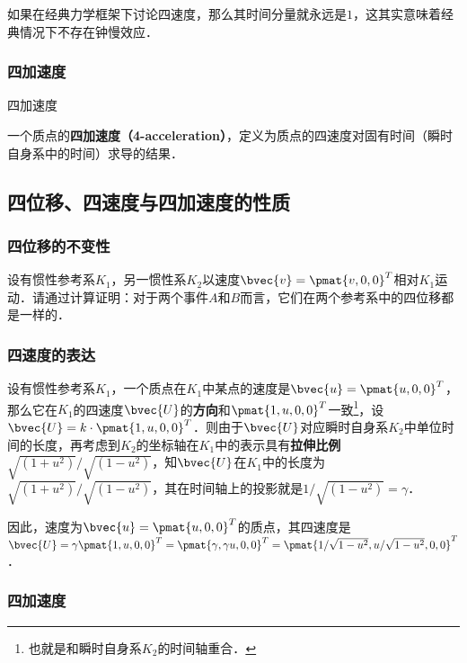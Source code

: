 如果在经典力学框架下讨论四速度，那么其时间分量就永远是$1$，这其实意味着经典情况下不存在钟慢效应．

\subsubsection{四加速度}

\begin{definition}{四加速度}

一个质点的\textbf{四加速度（4-acceleration）}，定义为质点的四速度对固有时间（瞬时自身系中的时间）求导的结果．

\end{definition}

\subsection{四位移、四速度与四加速度的性质}

\subsubsection{四位移的不变性}

\begin{exercise}{}

设有惯性参考系$K_1$，另一惯性系$K_2$以速度$\bvec{v}=\pmat{v, 0, 0}^T$相对$K_1$运动．请通过计算证明：对于两个事件$A$和$B$而言，它们在两个参考系中的四位移都是一样的．

\end{exercise}

\subsubsection{四速度的表达}

设有惯性参考系$K_1$，一个质点在$K_1$中某点的速度是$\bvec{u}=\pmat{u, 0, 0}^T$，那么它在$K_1$的四速度$\bvec{U}$的\textbf{方向}和$\pmat{1, u, 0, 0}^T$一致\footnote{也就是和瞬时自身系$K_2$的时间轴重合．}，设$\bvec{U}=k\cdot\pmat{1, u, 0, 0}^T$．则由于$\bvec{U}$对应瞬时自身系$K_2$中单位时间的长度，再考虑到$K_2$的坐标轴在$K_1$中的表示具有\textbf{拉伸比例}$\sqrt{(1+u^2)}/\sqrt{(1-u^2)}$，知$\bvec{U}$在$K_1$中的长度为$\sqrt{(1+u^2)}/\sqrt{(1-u^2)}$，其在时间轴上的投影就是$1/\sqrt{(1-u^2)}=\gamma$．

因此，速度为$\bvec{u}=\pmat{u, 0, 0}^T$的质点，其四速度是$\bvec{U}=\gamma\pmat{1, u, 0, 0}^T=\pmat{\gamma, \gamma u, 0, 0}^T=\pmat{1/\sqrt{1-u^2}, u/\sqrt{1-u^2}, 0, 0}^T$．

\subsubsection{四加速度}

